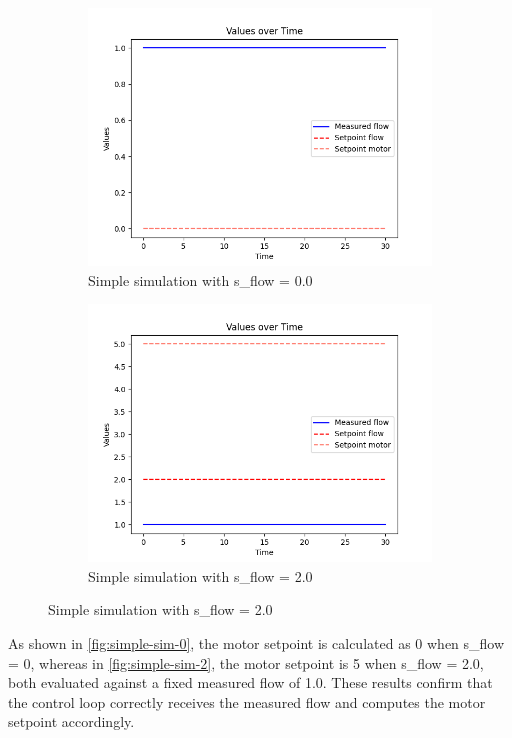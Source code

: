 \documentclass[we,final,11pt,oneside,openany]{uantwerpenbamathesis}
\begin{document}
\begin{figure}[h!]
    \begin{subfigure}{.5\textwidth}
        \centering
        \includegraphics[width=.8\linewidth]{Images/simulations/simple_simulation_0}
        \caption{Simple simulation with s\_flow = 0.0}
        \label{fig:simple-sim-0}
    \end{subfigure}%
    \begin{subfigure}{.5\textwidth}
        \centering
        \includegraphics[width=.8\linewidth]{Images/simulations/simple_simulation_2}
        \caption{Simple simulation with s\_flow = 2.0}
        \label{fig:simple-sim-2}
    \end{subfigure}
\end{figure}

As shown in \autoref{fig:simple-sim-0}, the motor setpoint is calculated as 0 when s\_flow = 0, whereas in \autoref{fig:simple-sim-2}, the motor setpoint is 5 when s\_flow = 2.0, both evaluated against a fixed measured flow of 1.0.
These results confirm that the control loop correctly receives the measured flow and computes the motor setpoint accordingly.
\end{document}
